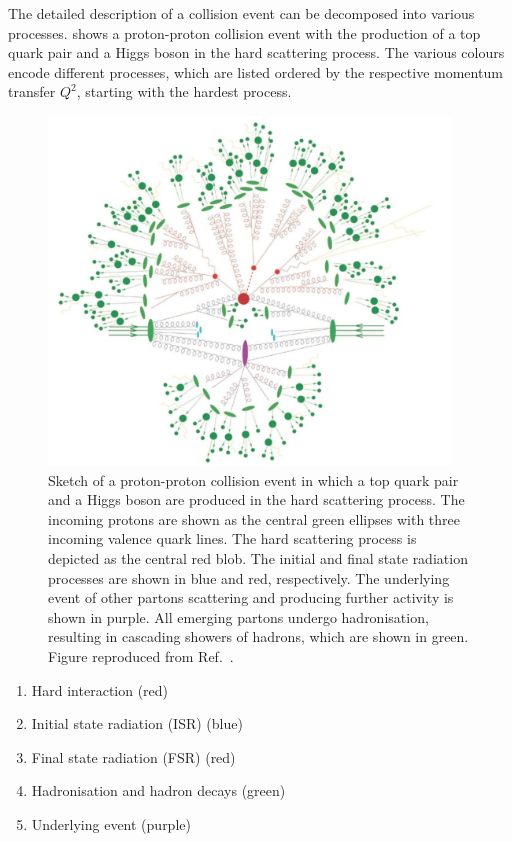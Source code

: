 The detailed description of a \HepProcess{\Pp\Pp} collision event can be decomposed into various processes.  shows a proton-proton collision event with the production of a top quark pair and a Higgs boson in the hard scattering process. The various colours encode different processes, which are listed ordered by the respective momentum transfer \(Q^2\), starting with the hardest process.
\begin{figure}[htbp]
	\centering
	\includegraphics[width=0.95\textwidth]{figures/protoncollisions/pp-event.png}
	\caption{Sketch of a proton-proton collision event in which a top quark pair and a Higgs boson are produced in the hard scattering process. The incoming protons are shown as the central green ellipses with three incoming valence quark lines. The hard scattering process is depicted as the central red blob. The initial and final state radiation processes are shown in blue and red, respectively. The underlying event of other partons scattering and producing further activity is shown in purple. All emerging partons undergo hadronisation, resulting in cascading showers of hadrons, which are shown in green. Figure reproduced from Ref.~\cite{Campbell2018}.}
	\label{fig:pp:collision}
\end{figure}
\begin{enumerate}
	\item Hard interaction (red)
	\item Initial state radiation (ISR) (blue)
	\item Final state radiation (FSR) (red)
	\item Hadronisation and hadron decays (green)
	\item Underlying event (purple)
\end{enumerate}

